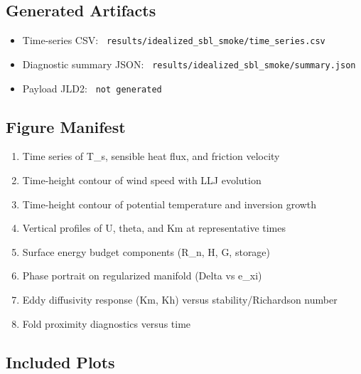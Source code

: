\subsection{Generated Artifacts}
\begin{itemize}
  \item Time-series CSV: \texttt{ results/idealized\_sbl\_smoke/time\_series.csv }
  \item Diagnostic summary JSON: \texttt{ results/idealized\_sbl\_smoke/summary.json }
  \item Payload JLD2: \texttt{ not generated }
\end{itemize}

\subsection{Figure Manifest}
\begin{enumerate}
  \item Time series of T\_s, sensible heat flux, and friction velocity
  \item Time-height contour of wind speed with LLJ evolution
  \item Time-height contour of potential temperature and inversion growth
  \item Vertical profiles of U, theta, and Km at representative times
  \item Surface energy budget components (R\_n, H, G, storage)
  \item Phase portrait on regularized manifold (Delta vs e\_xi)
  \item Eddy diffusivity response (Km, Kh) versus stability/Richardson number
  \item Fold proximity diagnostics versus time
\end{enumerate}

\subsection{Included Plots}

